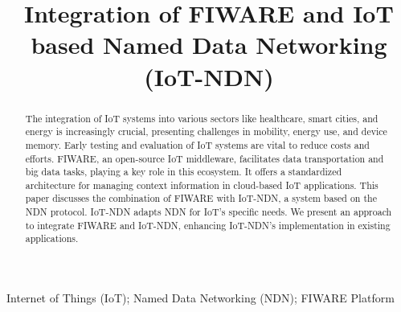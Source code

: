 \documentclass[conference]{IEEEtran}
\begin{document}
\title{Integration of FIWARE and IoT based Named Data Networking
    (IoT-NDN)
}

\author{
}

\maketitle

\begin{abstract}
    The integration of IoT systems into various sectors like healthcare, smart cities, and energy is increasingly crucial, presenting challenges in mobility, energy use, and device memory.
    Early testing and evaluation of IoT systems are vital to reduce costs and efforts.
    FIWARE, an open-source IoT middleware, facilitates data transportation and big data tasks, playing a key role in this ecosystem.
    It offers a standardized architecture for managing context information in cloud-based IoT applications.
    This paper discusses the combination of FIWARE with IoT-NDN, a system based on the NDN protocol.
    IoT-NDN adapts NDN for IoT's specific needs. We present an approach to integrate FIWARE and IoT-NDN, enhancing IoT-NDN's implementation in existing applications.
    \newline
\end{abstract}

\begin{IEEEkeywords}
    Internet of Things (IoT); Named Data Networking (NDN); FIWARE Platform
\end{IEEEkeywords}
\end{document}
